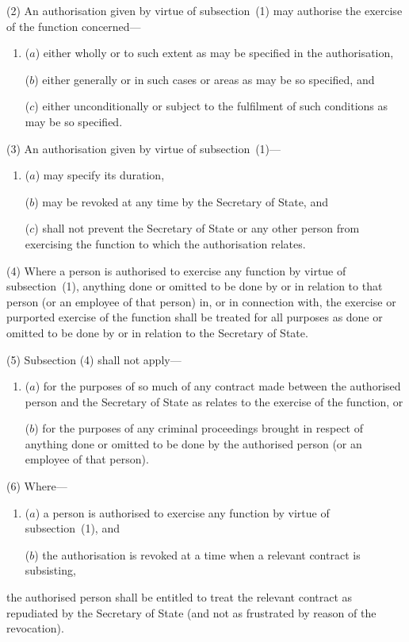 \documentclass[12pt,a4paper]{article}
\begin{document}
(2) An authorisation given by virtue of subsection~(1) may authorise the exercise of the function concerned—
\begin{enumerate}\item[]
($a$) either wholly or to such extent as may be specified in the authorisation,

($b$) either generally or in such cases or areas as may be so specified, and

($c$) either unconditionally or subject to the fulfilment of such conditions as may be so specified.
\end{enumerate}

(3) An authorisation given by virtue of subsection~(1)—
\begin{enumerate}\item[]
($a$) may specify its duration,

($b$) may be revoked at any time by the Secretary of State, and

($c$) shall not prevent the Secretary of State or any other person from exercising the function to which the authorisation relates.
\end{enumerate}

(4) Where a person is authorised to exercise any function by virtue of subsection~(1), anything done or omitted to be done by or in relation to that person (or an employee of that person) in, or in connection with, the exercise or purported exercise of the function shall be treated for all purposes as done or omitted to be done by or in relation to the Secretary of State.

(5) Subsection (4) shall not apply—
\begin{enumerate}\item[]
($a$) for the purposes of so much of any contract made between the authorised person and the Secretary of State as relates to the exercise of the function, or

($b$) for the purposes of any criminal proceedings brought in respect of anything done or omitted to be done by the authorised person (or an employee of that person).
\end{enumerate}

(6) Where—
\begin{enumerate}\item[]
($a$) a person is authorised to exercise any function by virtue of subsection~(1), and

($b$) the authorisation is revoked at a time when a relevant contract is subsisting,
\end{enumerate}
the authorised person shall be entitled to treat the relevant contract as repudiated by the Secretary of State (and not as frustrated by reason of the revocation).
\end{document}

